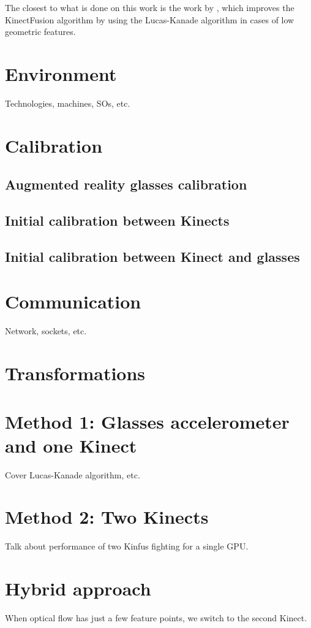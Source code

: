 \documentclass[msc, a4paper, classic, en]{ufbathesis}
\begin{document}
The closest to what is done on this work is the work by \cite{kinectkanade}, which improves the KinectFusion algorithm by using the Lucas-Kanade algorithm in cases of low geometric features.

\section{Environment}
Technologies, machines, SOs, etc.
\section{Calibration}
\subsection{Augmented reality glasses calibration}
\subsection{Initial calibration between Kinects}
\subsection{Initial calibration between Kinect and glasses}
\section{Communication}
Network, sockets, etc.
\section{Transformations}
\section{Method 1: Glasses accelerometer and one Kinect}
Cover Lucas-Kanade algorithm, etc.
\section{Method 2: Two Kinects}
Talk about performance of two Kinfus fighting for a single GPU.
\section{Hybrid approach}
When optical flow has just a few feature points, we switch to the second Kinect.
\end{document}
